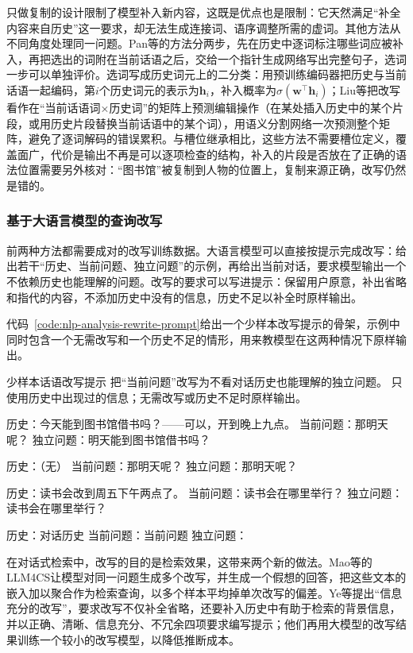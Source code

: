 只做复制的设计限制了模型补入新内容，这既是优点也是限制：它天然满足“补全内容来自历史”这一要求，却无法生成连接词、语序调整所需的虚词。其他方法从不同角度处理同一问题。Pan等的方法分两步，先在历史中逐词标注哪些词应被补入，再把选出的词附在当前话语之后，交给一个指针生成网络写出完整句子，选词一步可以单独评价。选词写成历史词元上的二分类：用预训练编码器把历史与当前话语一起编码，第$i$个历史词元的表示为$\bm h_i$，补入概率为$\sigma(\bm w^{\top}\bm h_i)$；Liu等把改写看作在“当前话语词×历史词”的矩阵上预测编辑操作（在某处插入历史中的某个片段，或用历史片段替换当前话语中的某个词），用语义分割网络一次预测整个矩阵，避免了逐词解码的错误累积。与槽位继承相比，这些方法不需要槽位定义，覆盖面广，代价是输出不再是可以逐项检查的结构，补入的片段是否放在了正确的语法位置需要另外核对：“图书馆”被复制到人物的位置上，复制来源正确，改写仍然是错的。

\subsubsection{基于大语言模型的查询改写}
\label{sec:nlp-analysis-llm-rewriting}

前两种方法都需要成对的改写训练数据。大语言模型可以直接按提示完成改写：给出若干“历史、当前问题、独立问题”的示例，再给出当前对话，要求模型输出一个不依赖历史也能理解的问题。改写的要求可以写进提示：保留用户原意，补出省略和指代的内容，不添加历史中没有的信息，历史不足以补全时原样输出。

代码~\ref{code:nlp-analysis-rewrite-prompt}给出一个少样本改写提示的骨架，示例中同时包含一个无需改写和一个历史不足的情形，用来教模型在这两种情况下原样输出。

\begin{codeblock}[label={code:nlp-analysis-rewrite-prompt}]{少样本话语改写提示}
把“当前问题”改写为不看对话历史也能理解的独立问题。
只使用历史中出现过的信息；无需改写或历史不足时原样输出。

历史：今天能到图书馆借书吗？——可以，开到晚上九点。
当前问题：那明天呢？
独立问题：明天能到图书馆借书吗？

历史：（无）
当前问题：那明天呢？
独立问题：那明天呢？

历史：读书会改到周五下午两点了。
当前问题：读书会在哪里举行？
独立问题：读书会在哪里举行？

历史：{对话历史}
当前问题：{当前问题}
独立问题：
\end{codeblock}

在对话式检索中，改写的目的是检索效果，这带来两个新的做法。Mao等的LLM4CS让模型对同一问题生成多个改写，并生成一个假想的回答，把这些文本的嵌入加以聚合作为检索查询，以多个样本平均掉单次改写的偏差。Ye等提出“信息充分的改写”，要求改写不仅补全省略，还要补入历史中有助于检索的背景信息，并以正确、清晰、信息充分、不冗余四项要求编写提示；他们再用大模型的改写结果训练一个较小的改写模型，以降低推断成本。

